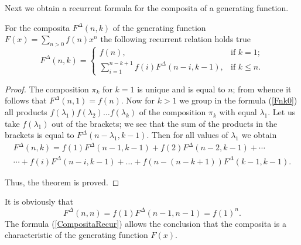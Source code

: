 \documentclass[12pt]{article}
\begin{document}
Next we obtain a recurrent formula for the composita of a generating function.

\begin{theorem} \label{TheoremFnk}
For the composita $F^{\Delta}(n,k)$ of the generating function $F(x)=\sum\limits_{n>0}f(n)x^n$ the following recurrent relation holds true
\begin{equation}
\label{CompositaRecur}
F^{\Delta}(n,k)=
\begin{cases}
f(n), & \text{if $k=1$};\\
\sum\limits_{i=1}^{n-k+1}f(i)F^{\Delta}(n-i,k-1), &
 \text{if $k\leq n$}.
\end{cases}
\end{equation}
\end{theorem}

\begin{proof}  
The composition $\pi_k$ for $k=1$ is unique and is equal to $n$; from whence it follows that $F^{\Delta}(n,1)=f(n)$. Now for $k>1$ we group in the formula (\ref{Fnk0}) all products $f(\lambda_1)f(\lambda_2)\ldots f(\lambda_k)$ of the composition $\pi_k$ with equal $\lambda_1$. Let us take $f(\lambda_1)$ out of the brackets; we see that the sum of the products in the brackets is equal to $F^{\Delta}(n-\lambda_1,k-1)$. Then for all values of $\lambda_1$ we obtain
\begin{multline*}
F^{\Delta}(n,k)=f(1)F^{\Delta}(n-1,k-1)+f(2)F^{\Delta}(n-2,k-1)+\cdots \\ \cdots +f(i)F^{\Delta}(n-i,k-1)+\ldots +f(n-(n-k+1))F^{\Delta}(k-1,k-1).
\end{multline*}

Thus, the theorem is proved.
\end{proof}

It is obviously that
$$
F^{\Delta}(n,n)=f(1)F^{\Delta}(n-1,n-1)=f(1)^n.
$$
The formula (\ref{CompositaRecur}) allows  the conclusion that the composita is a characteristic of the generating function $F(x)$.
\end{document}
